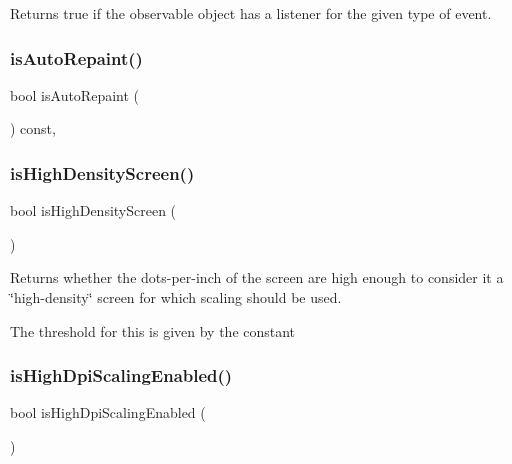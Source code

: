 Returns true if the observable object has a listener for the given type of event. 

\mbox{\label{classGForwardDrawingSurface_aa0b3b78666686fcd2a5b33a20febef0f}} 
\subsubsection{\texorpdfstring{is\+Auto\+Repaint()}{isAutoRepaint()}}
{\footnotesize\ttfamily bool is\+Auto\+Repaint (\begin{DoxyParamCaption}{ }\end{DoxyParamCaption}) const\hspace{0.3cm}{\ttfamily [virtual]}, {\ttfamily [inherited]}}

\mbox{\label{classGWindow_a674ef3ad6e66d778e410e130cad47274}} 
\subsubsection{\texorpdfstring{is\+High\+Density\+Screen()}{isHighDensityScreen()}}
{\footnotesize\ttfamily bool is\+High\+Density\+Screen (\begin{DoxyParamCaption}{ }\end{DoxyParamCaption})\hspace{0.3cm}{\ttfamily [static]}}



Returns whether the dots-\/per-\/inch of the screen are high enough to consider it a \char`\"{}high-\/density\char`\"{} screen for which scaling should be used. 

The threshold for this is given by the constant \mbox{\label{classGWindow_a040690336154a3f414001a16ffdb947e}} 
\subsubsection{\texorpdfstring{is\+High\+Dpi\+Scaling\+Enabled()}{isHighDpiScalingEnabled()}}
{\footnotesize\ttfamily bool is\+High\+Dpi\+Scaling\+Enabled (\begin{DoxyParamCaption}{ }\end{DoxyParamCaption})\hspace{0.3cm}{\ttfamily [static]}}



